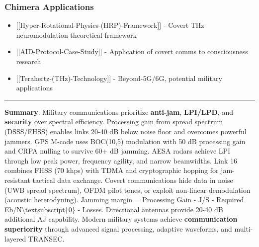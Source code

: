 \subsubsection{Chimera Applications}\label{chimera-applications}

\begin{itemize}
\tightlist
\item
  {[}{[}Hyper-Rotational-Physics-(HRP)-Framework{]}{]} - Covert THz
  neuromodulation theoretical framework
\item
  {[}{[}AID-Protocol-Case-Study{]}{]} - Application of covert comms to
  consciousness research
\item
  {[}{[}Terahertz-(THz)-Technology{]}{]} - Beyond-5G/6G, potential
  military applications
\end{itemize}

\begin{center}\rule{0.5\linewidth}{0.5pt}\end{center}

\textbf{Summary}: Military communications prioritize \textbf{anti-jam},
\textbf{LPI/LPD}, and \textbf{security} over spectral efficiency.
Processing gain from spread spectrum (DSSS/FHSS) enables links 20-40 dB
below noise floor and overcomes powerful jammers. GPS M-code uses
BOC(10,5) modulation with 50 dB processing gain and CRPA nulling to
survive 60+ dB jamming. AESA radars achieve LPI through low peak power,
frequency agility, and narrow beamwidths. Link 16 combines FHSS (70
khps) with TDMA and cryptographic hopping for jam-resistant tactical
data exchange. Covert communications hide data in noise (UWB spread
spectrum), OFDM pilot tones, or exploit non-linear demodulation
(acoustic heterodyning). Jamming margin = Processing Gain - J/S -
Required Eb/N\textbackslash textsubscript\{0\} - Losses. Directional
antennas provide 20-40 dB additional AJ capability. Modern military
systems achieve \textbf{communication superiority} through advanced
signal processing, adaptive waveforms, and multi-layered TRANSEC.
